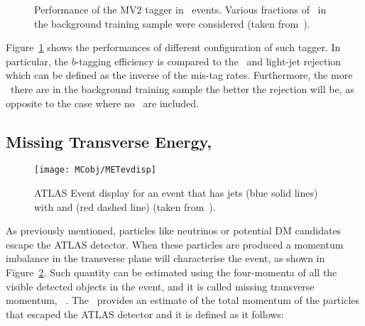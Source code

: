 			\begin{figure}[!htb]
				\begin{center}
					\hspace{0.05\textwidth}
				\end{center}
				\caption{Performance of the MV2 tagger in \ttbar\ events. Various fractions of \cjs\ in the background training sample were considered (taken from~\cite{ATL-PHYS-PUB-2016-012}).}
				\label{fig:btagEff}
			\end{figure}

			Figure~\ref{fig:btagEff} shows the performances of different configuration of such tagger. In particular, the $b$-tagging efficiency is compared to the \cjs\ and light-jet rejection which can be defined as the inverse of the mis-tag rates. Furthermore, the more \cj\ there are in the background training sample the better the rejection will be, as opposite to the case where no \cjs\ are included. 



		\subsection*{Missing Transverse Energy, \met}

			\begin{figure}[!htb]
				\centering
				\texttt{[image: MCobj/METevdisp]}
				\caption{\label{fig:METevdisp}ATLAS Event display for an event that has jets (blue solid lines) with and \met (red dashed line) (taken from~\cite{METevdisp}).}
			\end{figure}

			As previously mentioned, particles like neutrinos or potential \ac{DM} candidates escape the \ac{ATLAS} detector. When these particles are produced a momentum imbalance in the transverse plane will characterise the event, as shown in Figure~\ref{fig:METevdisp}. Such quantity can be estimated using the four-momenta of all the visible detected objects in the event, and it is called missing transverse momentum, \ptmiss~\cite{ATLASMet2015}. The \ptmiss\ provides an estimate of the total momentum of the particles that escaped the \ac{ATLAS} detector and it is defined as it follows: 

